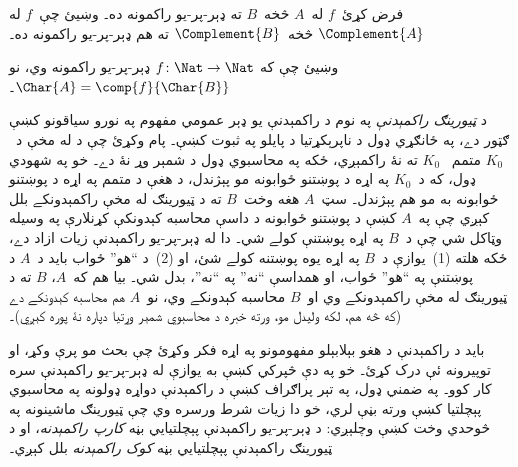 \documentclass[../../../include/open-logic-section]{subfiles}
\begin{document}
\begin{prob}
فرض کړئ~$f$ له~$A$ څخه~$B$ ته ډېر-پر-يو راکمونه ده۔ وښيئ چې~$f$ له
$\Complement{A}$ څخه~$\Complement{B}$ ته هم ډېر-پر-يو راکمونه ده۔
\end{prob}

\begin{prob}
وښيئ چې که $f\colon \Nat \to \Nat$ ډېر-پر-يو راکمونه وي، نو
$\Char{A} = \comp{f}{\Char{B}}$۔
\end{prob}

\begin{digress}
د \emph{ټيورينګ راکمېدنې} په نوم د راکمېدنې يو ډېر عمومي مفهوم په
نورو سياقونو کښې ګټور دے، په ځانګړي ډول د ناپرېکړتيا د پايلو په
ثبوت کښې۔ پام وکړئ چې د  له مخې د~$K_0$ متمم
~$K_0$ ته نۀ راکمېږي، ځکه په محاسبوي ډول د شمېر وړ نۀ دے۔ خو په
شهودي ډول، که د~$K_0$ په اړه د پوښتنو ځوابونه مو پېژندل، د هغې د
متمم په اړه د پوښتنو ځوابونه به مو هم پېژندل۔ سټ~$A$ هغه وخت~$B$ ته
د ټيورينګ له مخې راکمېدونکے بلل کېږي چې په~$A$ کښې د پوښتنو ځوابونه
د داسې محاسبه کېدونکې کړنلارې په وسيله وټاکل شي چې د~$B$ په اړه
پوښتنې کولے شي۔ دا له ډېر-پر-يو راکمېدنې زيات ازاد دے، ځکه هلته
(1)~يوازې د~$B$ په اړه يوه پوښتنه کولے شئ، او (2)~د ``هو'' ځواب بايد
د~$A$ د پوښتنې په ``هو'' ځواب، او همداسې ``نه'' په ``نه''، بدل شي۔
بيا هم که~$A$، $B$ ته د ټيورينګ له مخې راکمېدونکے وي او~$B$ محاسبه
کېدونکے وي، نو~$A$ هم محاسبه کېدونکے دے (که څه هم، لکه وليدل مو،
ورته خبره د محاسبوي شمېر وړتيا دپاره نۀ پوره کېږي)۔

بايد د راکمېدنې د هغو بېلابېلو مفهومونو په اړه فکر وکړئ چې بحث مو
پرې وکړ، او توپيرونه ئې درک کړئ۔ خو په دې څپرکي کښې به يوازې له
ډېر-پر-يو راکمېدنې سره کار کوو۔ په ضمني ډول، په تېر پراګراف کښې د
راکمېدنې دواړه ډولونه په محاسبوي پېچلتيا کښې ورته بڼې لري، خو دا
زيات شرط ورسره وي چې ټيورينګ ماشينونه په څوحدي وخت کښې وچلېږي: د
ډېر-پر-يو راکمېدنې پېچلتيايي بڼه \emph{کارپ راکمېدنه}، او د ټيورينګ
راکمېدنې پېچلتيايي بڼه \emph{کوک راکمېدنه} بلل کېږي۔
\end{digress}
\end{document}
